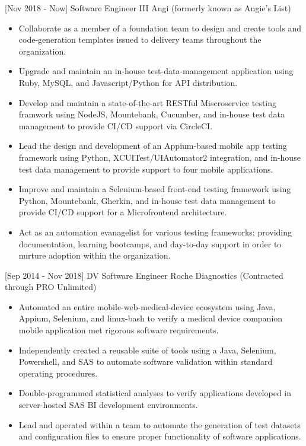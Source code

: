 \documentclass[]{moak-resume}
\begin{document}
 \begin{entrylist}
  \entry
    {[Nov 2018 - Now]}
    {Software Engineer III}
    {Angi (formerly known as Angie's List)}
    {}
\end{entrylist}
\begin{itemize}
  \setlength\itemsep{-0.4em}
  \item \small\bodyfont Collaborate as a member of a foundation team to design and create tools and code-generation templates issued to delivery teams throughout the organization.
  \item \small\bodyfont Upgrade and maintain an in-house test-data-management application using Ruby, MySQL, and Javascript/Python for API distribution.
  \item \small\bodyfont Develop and maintain a state-of-the-art RESTful Miscroservice testing framwork using NodeJS, Mountebank, Cucumber, and in-house test data management to provide CI/CD support via CircleCI.
  \item \small\bodyfont Lead the design and development of an Appium-based mobile app testing framework using Python, XCUITest/UIAutomator2 integration, and in-house test data management to provide support to four mobile applications.
  \item \small\bodyfont Improve and maintain a Selenium-based front-end testing framework using Python, Mountebank, Gherkin, and in-house test data management to provide CI/CD support for a Microfrontend architecture.
  \item \small\bodyfont Act as an automation evanagelist for various testing frameworks; providing documentation, learning bootcamps, and day-to-day support in order to nurture adoption within the organization.
  \newline
\end{itemize}

\begin{entrylist}
  \entry
    {[Sep 2014 - Nov 2018]}
    {DV Software Engineer}
    {Roche Diagnostics (Contracted through PRO Unlimited)}
    {}
\end{entrylist}
\begin{itemize}
  \setlength\itemsep{-0.4em}
  \item \small\bodyfont Automated an entire mobile-web-medical-device ecosystem using Java, Appium, Selenium, and linux-bash to verify a medical device companion mobile application met rigorous software requirements.
  \item \small\bodyfont Independently created a reusable suite of tools using a Java, Selenium, Powershell, and SAS to automate software validation within standard operating procedures.
  \item \small\bodyfont Double-programmed statistical analyses to verify applications developed in server-hosted SAS BI development environments. 
  \item \small\bodyfont Lead and operated within a team to automate the generation of test datasets and configuration files to ensure proper functionality of software applications.
  \newline
\end{itemize}
\end{document}
